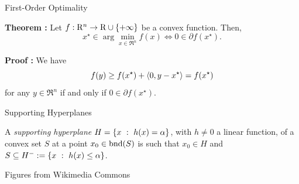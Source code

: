\documentclass[9pt]{beamer}
\begin{document}
\begin{frame}{First-Order Optimality}
  
  \textbf{Theorem : } Let $f:\mathrm{R}^n\to\mathrm{R}\cup\{+\infty\}$ be a convex function. Then,
  \[
    x^\star \in \arg\min_{x\in \Re^n} f(x) \iff 0 \in \partial f(x^\star).
  \]

  \textbf{Proof :} We have 
  \[
    f(y) \geq f(x^\star) + \left<0, y-x^\star\right> =f(x^\star)
  \]
  for any $y \in \Re^n$ if and only if $0 \in \partial f(x^\star)$. 

  \vfill

\begin{center}
  \end{center}

  
\end{frame}



\begin{frame}{Supporting Hyperplanes}

  A \emph{supporting hyperplane} $H=\left\{ x\ : \ h(x)=\alpha \right\}$, with $h\neq 0$ a linear function, of a convex set $S$ at a point $x_0 \in \operatorname{bnd}(S)$ is such that $x_0\in H$ and $S\subseteq H^-:= \left\{ x\ : \ h(x)\leq \alpha \right\}$.


  \vfill

  \begin{minipage}{0.5\textwidth}
    \centering
    
  \end{minipage}%
  \hfill
  \begin{minipage}{0.5\textwidth}
    \centering
    
  \end{minipage}

  \vfill
  {\tiny Figures from Wikimedia Commons}

  \vfill

\end{frame}
\end{document}
